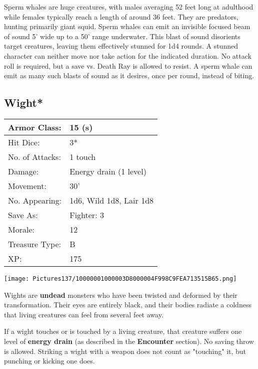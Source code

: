 \documentclass[a4paper,twoside,openany,10pt]{book}
\begin{document}
\begin{multicols}{2}
Sperm whales are huge creatures, with males averaging 52 feet long at adulthood while females typically reach a length of around 36 feet. They are predators, hunting primarily giant squid. Sperm whales can emit an invisible focused beam of sound 5'  wide up to a 50' range underwater. This blast of sound disorients target creatures, leaving them effectively stunned for 1d4 rounds. A stunned character can neither move nor take action for the indicated duration. No attack roll is required, but a save vs. Death Ray is allowed to resist. A sperm whale can emit as many such blasts of sound  as it desires, once per round, instead of biting.

\subsection*{Wight*}\label{wight}

\begin{tabularx}{0.50\textwidth}{@{}lX@{}}
Armor Class: & 15 (s) \\\hline
Hit Dice: & 3* \\\hline
No. of Attacks: & 1 touch \\\hline
Damage: & Energy drain (1 level) \\\hline
Movement: & 30' \\\hline
No. Appearing: & 1d6, Wild 1d8, Lair 1d8 \\\hline
Save As: & Fighter: 3 \\\hline
Morale: & 12 \\\hline
Treasure Type: & B \\\hline
XP: & 175 \\\hline
\end{tabularx}\medskip


\begin{center} \texttt{[image: Pictures137/10000001000003D8000004F998C9FEA713515B65.png]} \end{center}

Wights are \textbf{undead }monsters who have been twisted and deformed by their transformation. Their eyes are entirely black, and their bodies radiate a coldness that living creatures can feel from several feet away. 

If a wight touches or is touched by a living creature, that creature suffers one level of \textbf{energy drain} (as described in the \textbf{Encounter} section). No saving throw is allowed. Striking a wight with a weapon does not count as "touching" it, but punching or kicking one does.


\end{multicols}
\end{document}
